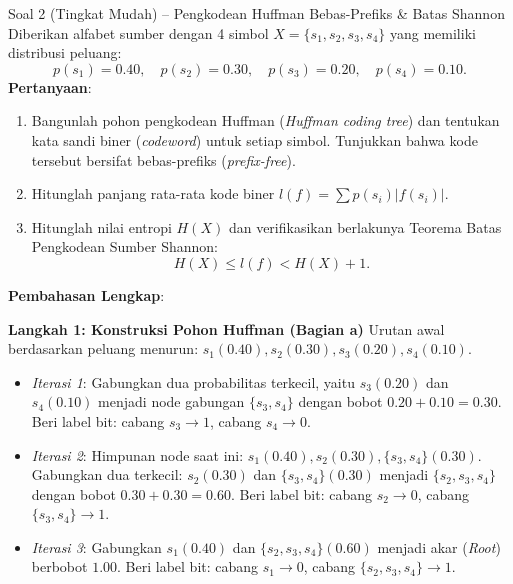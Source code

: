 \documentclass[11pt,a4paper]{article}
\begin{document}
\begin{soalmudah}{Soal 2 (Tingkat Mudah) -- Pengkodean Huffman Bebas-Prefiks \& Batas Shannon}
Diberikan alfabet sumber dengan 4 simbol $X = \{s_1, s_2, s_3, s_4\}$ yang memiliki distribusi peluang:
\[
p(s_1) = 0.40, \quad p(s_2) = 0.30, \quad p(s_3) = 0.20, \quad p(s_4) = 0.10.
\]
\textbf{Pertanyaan}:
\begin{enumerate}[label=\alph*)]
    \item Bangunlah pohon pengkodean Huffman (\textit{Huffman coding tree}) dan tentukan kata sandi biner (\textit{codeword}) untuk setiap simbol. Tunjukkan bahwa kode tersebut bersifat bebas-prefiks (\textit{prefix-free}).
    \item Hitunglah panjang rata-rata kode biner $l(f) = \sum p(s_i)|f(s_i)|$.
    \item Hitunglah nilai entropi $H(X)$ dan verifikasikan berlakunya Teorema Batas Pengkodean Sumber Shannon:
    \[
    H(X) \le l(f) < H(X) + 1.
    \]
\end{enumerate}
\end{soalmudah}

\noindent\textbf{Pembahasan Lengkap}:

\noindent\textbf{Langkah 1: Konstruksi Pohon Huffman (Bagian a)}
Urutan awal berdasarkan peluang menurun: $s_1 (0.40), s_2 (0.30), s_3 (0.20), s_4 (0.10)$.
\begin{itemize}
    \item \textit{Iterasi 1}: Gabungkan dua probabilitas terkecil, yaitu $s_3 (0.20)$ dan $s_4 (0.10)$ menjadi node gabungan $\{s_3, s_4\}$ dengan bobot $0.20 + 0.10 = 0.30$. Beri label bit: cabang $s_3 \to 1$, cabang $s_4 \to 0$.
    \item \textit{Iterasi 2}: Himpunan node saat ini: $s_1 (0.40), s_2 (0.30), \{s_3, s_4\} (0.30)$. Gabungkan dua terkecil: $s_2 (0.30)$ dan $\{s_3, s_4\} (0.30)$ menjadi $\{s_2, s_3, s_4\}$ dengan bobot $0.30 + 0.30 = 0.60$. Beri label bit: cabang $s_2 \to 0$, cabang $\{s_3, s_4\} \to 1$.
    \item \textit{Iterasi 3}: Gabungkan $s_1 (0.40)$ dan $\{s_2, s_3, s_4\} (0.60)$ menjadi akar (\textit{Root}) berbobot $1.00$. Beri label bit: cabang $s_1 \to 0$, cabang $\{s_2, s_3, s_4\} \to 1$.
\end{itemize}
\end{document}
